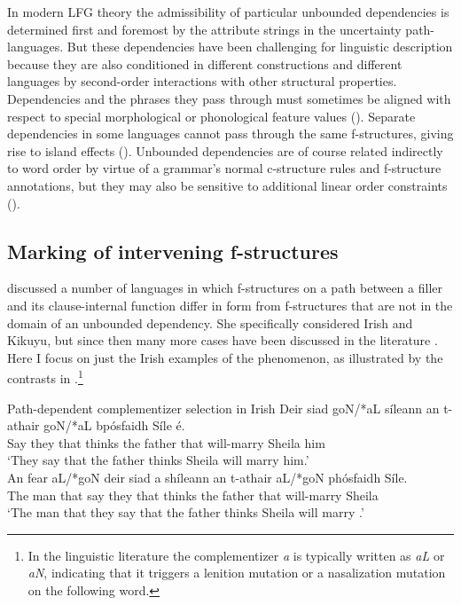 \documentclass[output=paper,hidelinks]{langscibook}
\begin{document}
In modern LFG theory the admissibility of particular unbounded dependencies is determined first and foremost by the attribute strings in the uncertainty path-languages.  But these dependencies have been challenging for linguistic description because they are also conditioned in different constructions and different languages by second-order interactions with other structural properties.  Dependencies and the phrases they pass through must sometimes be aligned with respect to special morphological or phonological feature values ().    Separate dependencies in some languages cannot pass through the same f-structures, giving rise to island effects ().  Unbounded dependencies are of course related indirectly to word order by virtue of a grammar's normal c-structure rules and f-structure annotations, but they may also be sensitive to additional linear order constraints ().

\subsection{Marking of intervening f-structures}\label{marking}

\citet{zaenen1983} discussed a number of languages in which f-structures on a path between a filler and its clause-internal function differ in form from f-structures that are not in the domain of an unbounded dependency.  She specifically considered Irish and Kikuyu, but since then many more cases have been discussed in the literature \citep[see e.g.][]{vanUrk}. Here I focus on just the Irish examples of the phenomenon, as illustrated by the contrasts in  \citep[data originally from][]{McCloskey79}.\footnote{In the linguistic literature the complementizer \textit{a} is typically written as \textit{aL} or \textit{aN}, indicating that it triggers a lenition mutation or a nasalization mutation on the following word.}

\ea\label{Irishexamples}
Path-dependent complementizer selection in Irish
\ea\label{Irishnocomp}\gll Deir siad goN/*aL síleann an t-athair goN/*aL bpósfaidh Síle é.\\
     Say they that thinks the father that will-marry Sheila him\\
\glt `They say that the father thinks Sheila will marry him.'\\

\ex\label{Irishcomp}
\gll An fear aL/*goN deir siad a shíleann an t-athair aL/*goN phósfaidh Síle.\\
    The man that say they that thinks the father that will-marry Sheila\\
\glt `The man that they say that the father thinks Sheila will marry \GAP.'\\
\z\z
\end{document}
